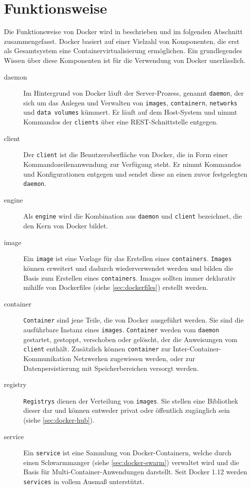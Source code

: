 \section{Funktionsweise}
\label{sec:docker-basics}
Die Funktionsweise von Docker wird in \autocite{docker-overview:online} beschrieben und im folgenden Abschnitt zusammengefasst.
Docker basiert auf einer Vielzahl von Komponenten, die erst als Gesamtsystem eine Containervirtualisierung ermöglichen.
Ein grundlegendes Wissen über diese Komponenten ist für die Verwendung von Docker unerlässlich.
\begin{description}
    \item [daemon] Im Hintergrund von Docker läuft der Server-Prozess, genannt \texttt{daemon}, der sich um das Anlegen und Verwalten von \texttt{images}, \texttt{containern}, \texttt{networks} und \texttt{data volumes} kümmert.
    Er läuft auf dem Host-System und nimmt Kommandos der \texttt{clients} über eine REST-Schnittstelle entgegen.
    \item [client] Der \texttt{client} ist die Benutzeroberfläche von Docker, die in Form einer Kommandozeilenanwendung zur Verfügung steht.
    Er nimmt Kommandos und Konfigurationen entgegen und sendet diese an einen zuvor festgelegten \texttt{daemon}.
    \item [engine] Als \texttt{engine} wird die Kombination aus \texttt{daemon} und \texttt{client} bezeichnet, die den Kern von Docker bildet.
    \item [image] Ein \texttt{image} ist eine Vorlage für das Erstellen eines \texttt{containers}. \texttt{Images} können erweitert und dadurch wiederverwendet werden und bilden die Basis zum Erstellen eines \texttt{containers}. Images sollten immer deklarativ mihilfe von Dockerfiles (siehe \cref{sec:dockerfiles}) erstellt werden.
    \item [container] \texttt{Container} sind jene Teile, die von Docker ausgeführt werden. Sie sind die ausführbare Instanz eines \texttt{images}. \texttt{Container} werden vom \texttt{daemon} gestartet, gestoppt, verschoben oder gelöscht, der die Anweisungen vom \texttt{client} enthält. Zusätzlich können \texttt{container} zur Inter-Container-Kommunikation Netzwerken zugewiesen werden, oder zur Datenpersistierung mit Speicherbereichen versorgt werden.
    \item [registry] \texttt{Registrys} dienen der Verteilung von \texttt{images}. Sie stellen eine Bibliothek dieser dar und können entweder privat oder öffentlich zugänglich sein (siehe \cref{sec:docker-hub}).
    \item [service] Ein \texttt{service} ist eine Sammlung von Docker-Containern, welche durch einen Schwarmmanger (siehe \cref{sec:docker-swarm}) verwaltet wird und die Basis für Multi-Container-Anwendungen darstellt. Seit Docker 1.12 werden \texttt{services} in vollem Ausmaß unterstützt.
\end{description}
